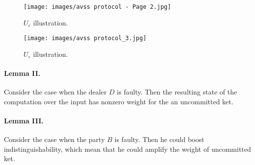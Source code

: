 \documentclass{article}
\begin{document}
\begin{multicols*}{2}
\begin{figure}[H]
\texttt{[image: images/avss protocol - Page 2.jpg]}
\caption{ \(U_{\varepsilon}\) illustration. }
    \label{fig:simulation_cases}
\end{figure}

\begin{figure}[H]
\texttt{[image: images/avss protocol\_3.jpg]}
\caption{ \(U_{\varepsilon}\) illustration. }
    \label{fig:simulation_cases}
\end{figure}

\paragraph{Lemma II.} Consider the case when the dealer \(D\) is faulty. Then the resulting state of the computation over the input has nonzero weight for the an uncommitted ket.

\paragraph{Lemma III.} Consider the case when the party \(B\) is faulty. Then he could boost indistinguishability, which mean that he could amplify the weight of uncommitted ket.

\end{multicols*}
\end{document}
